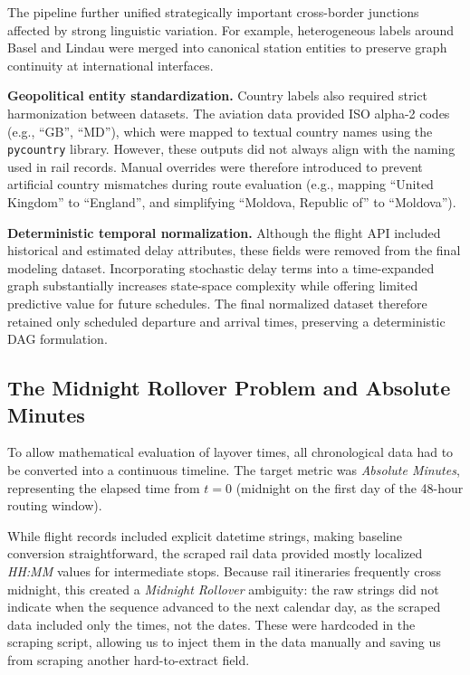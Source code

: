 \medskip

The pipeline further unified strategically important cross-border junctions affected by strong linguistic variation. For example, heterogeneous labels around Basel and Lindau were merged into canonical station entities to preserve graph continuity at international interfaces.

\medskip

\noindent\textbf{Geopolitical entity standardization.}
Country labels also required strict harmonization between datasets. The aviation data provided ISO alpha-2 codes (e.g., ``GB'', ``MD''), which were mapped to textual country names using the \texttt{pycountry} library. However, these outputs did not always align with the naming used in rail records. Manual overrides were therefore introduced to prevent artificial country mismatches during route evaluation (e.g., mapping ``United Kingdom'' to ``England'', and simplifying ``Moldova, Republic of'' to ``Moldova'').

\medskip

\noindent\textbf{Deterministic temporal normalization.}
Although the flight API included historical and estimated delay attributes, these fields were removed from the final modeling dataset. Incorporating stochastic delay terms into a time-expanded graph substantially increases state-space complexity while offering limited predictive value for future schedules. The final normalized dataset therefore retained only scheduled departure and arrival times, preserving a deterministic DAG formulation.

\subsection{The Midnight Rollover Problem and Absolute Minutes}
\label{subsec:midnight_rollover_absolute_minutes}
To allow mathematical evaluation of layover times, all chronological data had to be converted into a continuous timeline. The target metric was \textit{Absolute Minutes}, representing the elapsed time from $t=0$ (midnight on the first day of the 48-hour routing window).

\medskip

While flight records included explicit datetime strings, making baseline conversion straightforward, the scraped rail data provided mostly localized \textit{HH:MM} values for intermediate stops. Because rail itineraries frequently cross midnight, this created a \textit{Midnight Rollover} ambiguity: the raw strings did not indicate when the sequence advanced to the next calendar day, as the scraped data included only the times, not the dates. These were hardcoded in the scraping script, allowing us to inject them in the data manually and saving us from scraping another hard-to-extract field.

